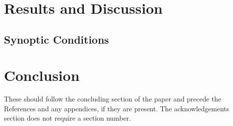 \documentclass[smallextended]{svjour3}
\begin{document}
\section{Results and Discussion}
\label{sec:res_disc}


\subsection{Synoptic Conditions}



\section{Conclusion}
\label{sec:conclusion}



\begin{acknowledgements}
These should follow the concluding section of the paper and precede the References and any appendices, if they are present. The acknowledgements section does not require a section number. 
\end{acknowledgements} 






     
 
\end{document}
